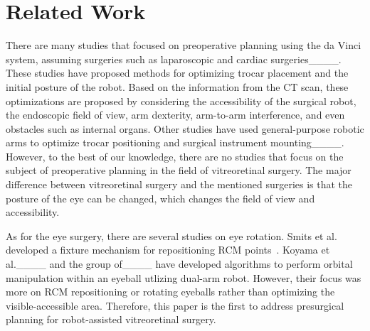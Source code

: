 \section{Related Work}
There are many studies that focused on preoperative planning using the da Vinci system, assuming surgeries such as laparoscopic and cardiac surgeries____. These studies have proposed methods for optimizing trocar placement and the initial posture of the robot. Based on the information from the CT scan, these optimizations are proposed by considering the accessibility of the surgical robot, the endoscopic field of view, arm dexterity, arm-to-arm interference, and even obstacles such as internal organs. Other studies have used general-purpose robotic arms to optimize trocar positioning and surgical instrument mounting____.
However, to the best of our knowledge, there are no studies that focus on the subject of preoperative planning in the field of vitreoretinal surgery. The major difference between vitreoretinal surgery and the mentioned surgeries is that the posture of the eye can be changed, which changes the field of view and accessibility. 

As for the eye surgery, there are several studies on eye rotation.
Smits et al. developed a fixture mechanism for repositioning RCM points~\cite {KUlevensetupandmethod}. Koyama et al.____ and the group of____ have developed algorithms to perform orbital manipulation within an eyeball utlizing dual-arm robot. However, their focus was more on RCM repositioning or rotating eyeballs rather than optimizing the visible-accessible area.
Therefore, this paper is the first to address presurgical planning for robot-assisted vitreoretinal surgery.